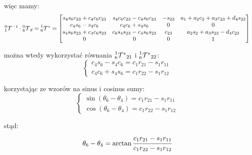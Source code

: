 \documentclass[]{article}
\newcommand\T{\mathcal{T}}
\begin{document}
więc mamy:
\[\prescript{0}{1}{\T}^{-1} \cdot \prescript{0}{6}{\T}_d = \prescript{1}{6}{\T^*} = \begin{bmatrix}
s_4s_6c_{23} + c_4c_6c_{23} &
s_4c_6c_{23} - c_4s_6c_{23} &
- s_{23} &
a_1 + a_2c_2 + a_3c_{23} + d_4s_{23}
\\
c_4s_6 - s_4c_6 &
c_4c_6 + s_4s_6 &
0 &
0
\\
s_4s_6s_{23} + c_4c_6s_{23} &
c_6s_4s_{23} - c_4s_6s_{23} &
c_{23} &
a_2s_2 + a_3s_{23} - d_4c_{23}
\\
0 & 0 & 0 & 1
\end{bmatrix}\]

można wtedy wykorzystać równania $\prescript{1}{6}{\T^*}_{21}$ i $\prescript{1}{6}{\T^*}_{22}$:
\[\left\{\begin{array}{l}
c_4s_6 - s_4c_6 = c_1r_{21} - s_1r_{11} \\
c_4c_6 + s_4s_6 = c_1r_{22} - s_1r_{12}
\end{array}\right.\]

korzystając ze wzorów na sinus i cosinus sumy:
\[\left\{\begin{array}{l}
\sin(\theta_6 - \theta_4) = c_1r_{21} - s_1r_{11} \\
\cos(\theta_6 - \theta_4) = c_1r_{22} - s_1r_{12}
\end{array}\right.\]

stąd:
\[
\theta_6 - \theta_4 = \arctan\cfrac{c_1r_{21} - s_1r_{11}}{c_1r_{22} - s_1r_{12}}
\]
\end{document}
